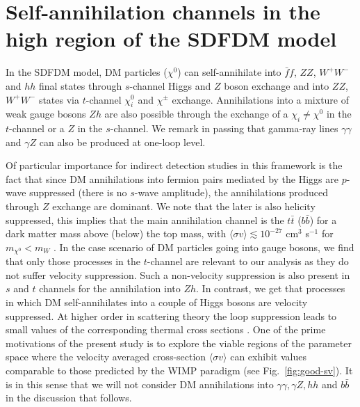 \section{Self-annihilation channels in the high region of the SDFDM model}
\label{sec:modelgce}

In the SDFDM model, DM particles ($\chi^0$) can self-annihilate into $\bar{f}f$, $ZZ$, $W^+W^-$ and $hh$ final states through  $s$-channel Higgs and $Z$ boson exchange and into $ZZ$, $W^+W^-$ states via $t$-channel $\chi_i^0$ and $\chi^{\pm}$ exchange. Annihilations into a mixture of weak gauge bosons $Zh$ are also possible through the exchange of a $\chi_i\neq\chi^0$  in the $t$-channel or a $Z$ in the $s$-channel.  We remark in passing that gamma-ray lines $\gamma\gamma$ and $\gamma Z$ can also be produced at one-loop level. 

Of particular importance for indirect detection studies in this framework is the fact that since DM annihilations into fermion pairs mediated by the Higgs are $p$-wave suppressed (there is no $s$-wave amplitude), the annihilations produced through $Z$ exchange are dominant. We note that the later is also helicity suppressed, this implies that the main annihilation channel is the $t\bar{t}$ ($b\bar{b}$) for a dark matter mass above (below) the top mass, with $\langle\sigma v \rangle\lesssim 10^{-27}$ cm$^3$ s$^{-1}$ for $m_{\chi^0}<m_W$ \cite{Calibbi:2015nha}. In the case scenario of DM particles going into gauge bosons, we find that only those processes in the $t$-channel are relevant to our analysis as they do not suffer velocity suppression. Such a non-velocity suppression is also present in $s$ and $t$ channels for the annihilation into $Zh$. 
In contrast, we get that processes in which DM self-annihilates into a couple of Higgs bosons are velocity suppressed. 
At higher order in scattering theory the loop suppression leads to small values of the corresponding thermal cross sections \cite{Calibbi:2015nha}. One of the prime motivations of the present study is to explore the viable regions of the parameter space where the velocity averaged cross-section $\langle\sigma v\rangle$ can exhibit values comparable to those predicted by the WIMP paradigm (see Fig.~\ref{fig:good-sv}). It is in this sense that we will not consider DM annihilations into $\gamma\gamma,\gamma Z,hh$ and $ b\bar{b}$ in the discussion that follows.  

